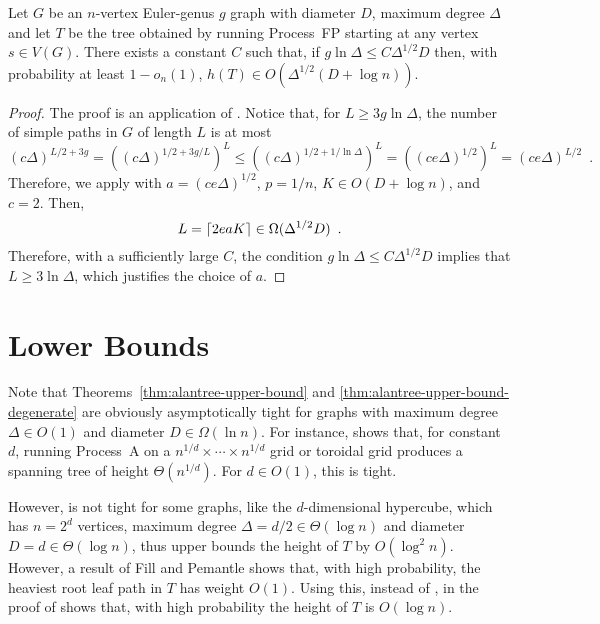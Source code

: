 \documentclass[lotsofwhite]{patmorin}
\begin{document}
\begin{thm}
  Let $G$ be an $n$-vertex Euler-genus $g$ graph with diameter $D$,
  maximum degree $\Delta$ and let $T$ be the tree obtained by running
  Process~FP starting at any vertex $s\in V(G)$.  There exists a constant
  $C$ such that, if $g\ln\Delta \le C\Delta^{1/2}D$ then,
  with probability at least $1-o_n(1)$,
  $h(T)\in O(\Delta^{1/2}(D+\log n))$.
\end{thm}

\begin{proof}
  The proof is an application of .  Notice that,
  for $L\ge 3g\ln\Delta$, the number of simple paths in $G$ of length
  $L$ is at most
  \[
     (c\Delta)^{L/2+3g} 
        = \left((c\Delta)^{1/2+3g/L}\right)^L
        \le \left((c\Delta)^{1/2+1/\ln\Delta}\right)^L
        = \left((ce\Delta)^{1/2}\right)^L
        = (ce\Delta)^{L/2} \enspace .
  \]
  Therefore, we apply  with $a=(ce\Delta)^{1/2}$,
  $p=1/n$, $K\in O(D+\log n)$, and $c=2$.  Then,
  \[
      L={\lceil 2eaK \rceil} \in \Omega(\Delta^{1/2}D) \enspace .
  \]
  Therefore, with a sufficiently large $C$, the condition $g\ln\Delta \le C\Delta^{1/2}D$ implies that $L\ge 3\ln\Delta$, which justifies the choice of $a$.
\end{proof}


\section{Lower Bounds}

Note that Theorems~\ref{thm:alantree-upper-bound} and
\ref{thm:alantree-upper-bound-degenerate} are obviously asymptotically
tight for graphs with maximum degree $\Delta\in O(1)$ and diameter
$D\in\Omega(\ln n)$.  For instance, 
shows that, for constant $d$, running Process~A on a $n^{1/d}\times
\cdots\times n^{1/d}$ grid or toroidal grid produces a spanning tree of
height $\Theta(n^{1/d})$.  For $d\in O(1)$, this is tight.

However,  is not tight for some graphs,
like the $d$-dimensional hypercube, which has $n=2^d$ vertices, maximum
degree $\Delta = d/2 \in \Theta(\log n)$ and diameter $D=d\in\Theta(\log
n)$, thus  upper bounds the height
of $T$ by $O(\log^2 n)$.  However, a result of Fill and Pemantle
\cite{fill.pemantle:first} shows that, with high probability, the
heaviest root leaf path in $T$ has weight $O(1)$.  Using this, instead
of , in the proof of 
shows that, with high probability the height of $T$ is $O(\log n)$.
\end{document}
